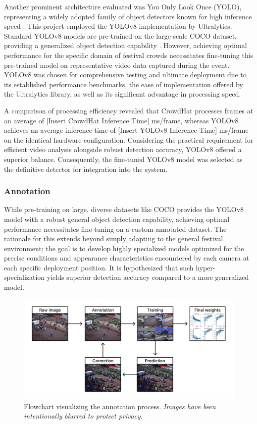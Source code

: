 Another prominent architecture evaluated was You Only Look Once (YOLO), representing a widely adopted family of object detectors known for high inference speed \cite{yolo}. This project employed the YOLOv8 implementation by Ultralytics. Standard YOLOv8 models are pre-trained on the large-scale COCO dataset, providing a generalized object detection capability \cite{ultralytics} \cite{coco}. However, achieving optimal performance for the specific domain of festival crowds necessitates fine-tuning this pre-trained model on representative video data captured during the event. YOLOv8 was chosen for comprehensive testing and ultimate deployment due to its established performance benchmarks, the ease of implementation offered by the Ultralytics library, as well as its significant advantage in processing speed.

A comparison of processing efficiency revealed that CrowdHat processes frames at an average of [Insert CrowdHat Inference Time] ms/frame, whereas YOLOv8 achieves an average inference time of [Insert YOLOv8 Inference Time] ms/frame on the identical hardware configuration. Considering the practical requirement for efficient video analysis alongside robust detection accuracy, YOLOv8 offered a superior balance. Consequently, the fine-tuned YOLOv8 model was selected as the definitive detector for integration into the system.



\subsubsection{Annotation}

While pre-training on large, diverse datasets like COCO provides the YOLOv8 model with a robust general object detection capability, achieving optimal performance necessitates fine-tuning on a custom-annotated dataset. The rationale for this extends beyond simply adapting to the general festival environment; the goal is to develop highly specialized models optimized for the precise conditions and appearance characteristics encountered by each camera at each specific deployment position. It is hypothesized that such hyper-specialization yields superior detection accuracy compared to a more generalized model.

\begin{figure}
  \centering
  \includegraphics[width=\textwidth]{Pictures/Figures/annotation_flowchart.png}
  \caption{Flowchart visualizing the annotation process. \textit{Images have been intentionally blurred to protect privacy}.}
\end{figure}

